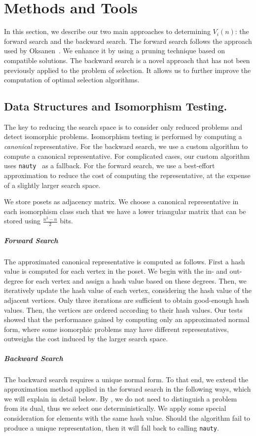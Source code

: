\documentclass[a4paper,UKenglish,cleveref, autoref, thm-restate]{lipics-v2021}
\begin{document}
\section{Methods and Tools}

In this section, we describe our two main approaches to determining $V_i(n)$: the forward search and the backward search.
The forward search follows the approach used by Oksanen~\cite{Oksanen2006}.
We enhance it by using a pruning technique based on compatible solutions.
The backward search is a novel approach that has not been previously applied to the problem of selection.
It allows us to further improve the computation of optimal selection algorithms.%

\subsection{Data Structures and Isomorphism Testing.}
The key to reducing the search space is to consider only reduced problems and detect isomorphic problems.
Isomorphism testing is performed by computing a \emph{canonical} representative.
For the backward search, we use a custom algorithm to compute a canonical representative.
For complicated cases, our custom algorithm uses \texttt{nauty}~\cite{MCKAY201494} as a fallback.
For the forward search, we use a best-effort approximation to reduce the cost of computing the representative, at the expense of a slightly larger search space.

We store posets as adjacency matrix.
We choose a canonical representative in each isomorphism class such that we have a lower triangular matrix that can be stored using $\frac{n^2 - n}{2}$ bits.

\subparagraph{Forward Search}
The approximated canonical representative is computed as follows.
First a hash value is computed for each vertex in the poset.
We begin with the in- and out-degree for each vertex and assign a hash value based on these degrees.
Then, we iteratively update the hash value of each vertex, considering the hash value of the adjacent vertices.
Only three iterations are sufficient to obtain good-enough hash values.
Then, the vertices are ordered according to their hash values.
Our tests showed that the performance gained by computing only an approximated normal form, where some isomorphic problems may have different representatives, outweighs the cost induced by the larger search space.

\subparagraph{Backward Search} \label{sec:backward:normal_form}
The backward search requires a unique normal form.
To that end, we extend the approximation method applied in the forward search in the following ways, which we will explain in detail below.
By , we do not need to distinguish a problem from its dual, thus we select one deterministically.
We apply some special consideration for elements with the same hash value.
Should the algorithm fail to produce a unique representation, then it will fall back to calling \texttt{nauty}.
\end{document}
